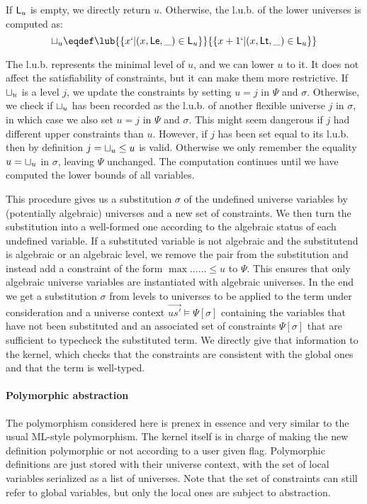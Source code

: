 If $\mathsf{L}_{u}$ is empty, we directly return $u$. Otherwise, the l.u.b. of
the lower universes is computed as:
\[\LUB{u} \eqdef
\lub{\{ x `| (x, \Le, \_) \in \Left{u} \}}{\{ x+1 `| (x, \Lt, \_) \in \Left{u}\}}\]

The l.u.b. represents the minimal level of $u$, and we can lower $u$ to
it. It does not affect the satisfiability of constraints, but it can
make them more restrictive. If $\sqcup_u$ is a level $j$, we update the
constraints by setting $u = j$ in $Ψ$ and $σ$. Otherwise, we check if
$\sqcup_u$ has been recorded as the l.u.b. of another flexible universe
$j$ in $σ$, in which case we also set $u = j$ in $Ψ$ and $σ$. This
might seem dangerous if $j$ had different upper constraints than
$u$. However, if $j$ has been set equal to its l.u.b. then by definition
$j = \sqcup_u \leq u$ is valid. Otherwise we only remember the equality
$u = \sqcup_u$ in $σ$, leaving $Ψ$ unchanged.  The computation
continues until we have computed the lower bounds of all variables.

This procedure gives us a substitution $σ$ of the undefined universe
variables by (potentially algebraic) universes and a new set of
constraints. We then turn the substitution into a well-formed one
according to the algebraic status of each undefined variable. If a
substituted variable is not algebraic and the substitutend is algebraic
or an algebraic level, we remove the pair from the substitution and
instead add a constraint of the form $\max{\ldots}{\ldots} \le u$ to
$Ψ$. This ensures that only algebraic universe variables are
instantiated with algebraic universes. In the end we get a substitution
$σ$ from levels to universes to be applied to the term under
consideration and a universe context $\vec{us'} \models Ψ[σ]$
containing the variables that have not been substituted and an
associated set of constraints $Ψ[σ]$ that are sufficient to typecheck
the substituted term. We directly give that information to the
kernel, which checks that the constraints are consistent with the
global ones and that the term is well-typed.

\paragraph{Polymorphic abstraction}
The polymorphism considered here is prenex in essence and very similar
to the usual ML-style polymorphism.  The kernel itself is in charge of
making the new definition polymorphic or not according to a user given
flag. Polymorphic definitions are just stored with their universe
context, with the set of local variables serialized as a list of
universes. Note that the set of constraints can still refer to global
variables, but only the local ones are subject to
abstraction.


